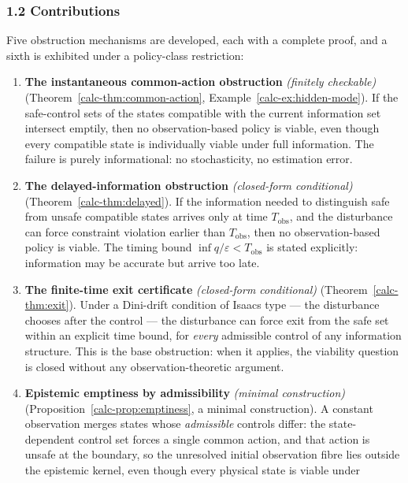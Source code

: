 \documentclass[10pt,twocolumn]{article}
\theoremstyle{definition}
\begin{document}
\subsubsection{1.2 Contributions}\label{calc-contributions}

Five obstruction mechanisms are developed, each with a complete proof,
and a sixth is exhibited under a policy-class restriction:

\begin{enumerate}
\def\labelenumi{\arabic{enumi}.}
\item
  \textbf{The instantaneous common-action obstruction} \emph{(finitely checkable)} (Theorem~\ref{calc-thm:common-action},
  Example~\ref{calc-ex:hidden-mode}). If the safe-control sets of the states compatible with the
  current information set intersect emptily, then no observation-based
  policy is viable, even though every compatible state is individually
  viable under full information. The failure is purely informational: no
  stochasticity, no estimation error.
\item
  \textbf{The delayed-information obstruction} \emph{(closed-form conditional)} (Theorem~\ref{calc-thm:delayed}). If the
  information needed to distinguish safe from unsafe compatible states
  arrives only at time \(T_{\mathrm{obs}}\), and the disturbance can
  force constraint violation earlier than \(T_{\mathrm{obs}}\), then no
  observation-based policy is viable. The timing bound
  \(\inf q / \varepsilon < T_{\mathrm{obs}}\) is stated explicitly:
  information may be accurate but arrive too late.
\item
  \textbf{The finite-time exit certificate} \emph{(closed-form conditional)} (Theorem~\ref{calc-thm:exit}). Under a
  Dini-drift condition of Isaacs type --- the disturbance chooses after
  the control --- the disturbance can force exit from the safe set
  within an explicit time bound, for \emph{every} admissible control of
  any information structure. This is the base obstruction: when it
  applies, the viability question is closed without any
  observation-theoretic argument.
\item
  \textbf{Epistemic emptiness by admissibility} \emph{(minimal construction)} (Proposition~\ref{calc-prop:emptiness}, a minimal
  construction). A constant observation merges states whose
  \emph{admissible} controls differ: the state-dependent control set
  forces a single common action, and that action is unsafe at the
  boundary, so the unresolved initial observation fibre lies outside the
  epistemic kernel, even though every physical state is viable under

\end{enumerate}
\end{document}
